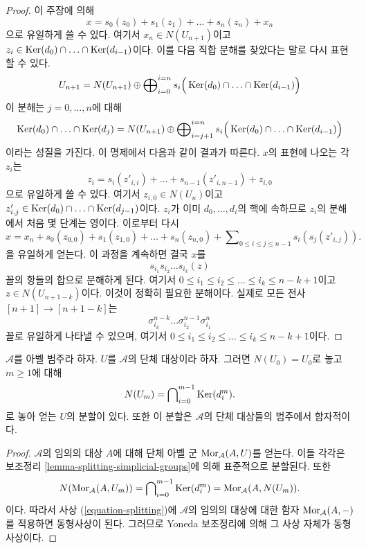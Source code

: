 \begin{proof}
\medskip\noindent
이 주장에 의해
$$
x = s_0(z_0) + s_1(z_1) + \ldots + s_n(z_n) + x_n
$$
으로 유일하게 쓸 수 있다. 여기서 $x_n \in N(U_{n + 1})$이고
$z_i \in \mathop{\mathrm{Ker}}(d_0) \cap \ldots \cap \mathop{\mathrm{Ker}}(d_{i - 1})$이다.
이를 다음 직합 분해를 찾았다는 말로 다시 표현할 수 있다.
$$
U_{n + 1}
=
N(U_{n + 1})
\oplus
\bigoplus\nolimits_{i = 0}^{i = n}
s_i\Big(\mathop{\mathrm{Ker}}(d_0) \cap \ldots \cap \mathop{\mathrm{Ker}}(d_{i - 1})\Big)
$$
이 분해는 $j = 0, \ldots, n$에 대해
$$
\mathop{\mathrm{Ker}}(d_0) \cap \ldots \cap \mathop{\mathrm{Ker}}(d_j)
=
N(U_{n + 1}) \oplus
\bigoplus\nolimits_{i = j + 1}^{i = n}
s_i\Big(\mathop{\mathrm{Ker}}(d_0) \cap \ldots \cap \mathop{\mathrm{Ker}}(d_{i - 1})\Big)
$$
이라는 성질을 가진다. 이 명제에서 다음과 같이 결과가 따른다.
$x$의 표현에 나오는 각 $z_i$는
$$
z_i = s_i(z'_{i, i}) + \ldots + s_{n - 1}(z'_{i, n - 1}) + z_{i, 0}
$$
으로 유일하게 쓸 수 있다. 여기서 $z_{i, 0} \in N(U_n)$이고
$z'_{i, j} \in \mathop{\mathrm{Ker}}(d_0) \cap \ldots \cap \mathop{\mathrm{Ker}}(d_{j - 1})$이다.
$z_i$가 이미 $d_0, \ldots, d_i$의 핵에 속하므로 $z_i$의 분해에서
처음 몇 단계는 영이다. 이로부터 다시
$$
x = x_n + s_0(z_{0, 0}) + s_1(z_{1, 0}) + \ldots + s_n(z_{n, 0}) +
\sum\nolimits_{0 \leq i \leq j \leq n - 1} s_i(s_j(z'_{i, j})).
$$
을 유일하게 얻는다. 이 과정을 계속하면 결국 $x$를
$$
s_{i_1} s_{i_2} \ldots s_{i_k} (z)
$$
꼴의 항들의 합으로 분해하게 된다. 여기서
$0 \leq i_1 \leq i_2 \leq \ldots \leq i_k \leq n - k + 1$이고
$z \in N(U_{n + 1 - k})$이다. 이것이 정확히 필요한 분해이다.
실제로 모든 전사 $[n + 1] \to [n + 1 - k]$는
$$
\sigma^{n - k}_{i_k} \ldots \sigma^{n - 1}_{i_2} \sigma^n_{i_1}
$$
꼴로 유일하게 나타낼 수 있으며, 여기서
$0 \leq i_1 \leq i_2 \leq \ldots \leq i_k \leq n - k + 1$이다.
\end{proof}

\begin{lemma}
\label{lemma-splitting-abelian-category}
$\mathcal{A}$를 아벨 범주라 하자.
$U$를 $\mathcal{A}$의 단체 대상이라 하자.
그러면 $N(U_0) = U_0$로 놓고 $m \geq 1$에 대해
$$
N(U_m) = \bigcap\nolimits_{i = 0}^{m - 1} \mathop{\mathrm{Ker}}(d^m_i).
$$
로 놓아 얻는 $U$의 분할이 있다. 또한 이 분할은
$\mathcal{A}$의 단체 대상들의 범주에서 함자적이다.
\end{lemma}

\begin{proof}
$\mathcal{A}$의 임의의 대상 $A$에 대해 단체 아벨 군
$\mathop{\mathrm{Mor}}\nolimits_\mathcal{A}(A, U)$를 얻는다. 이들 각각은 보조정리
\ref{lemma-splitting-simplicial-groups}에 의해 표준적으로 분할된다.
또한
$$
N(\mathop{\mathrm{Mor}}\nolimits_\mathcal{A}(A, U_m)) =
\bigcap\nolimits_{i = 0}^{m - 1} \mathop{\mathrm{Ker}}(d^m_i) =
\mathop{\mathrm{Mor}}\nolimits_\mathcal{A}(A, N(U_m)).
$$
이다. 따라서 사상 (\ref{equation-splitting})에
$\mathcal{A}$의 임의의 대상에 대한 함자 $\mathop{\mathrm{Mor}}\nolimits_\mathcal{A}(A, -)$를
적용하면 동형사상이 된다. 그러므로 Yoneda 보조정리에 의해 그 사상
자체가 동형사상이다.
\end{proof}

